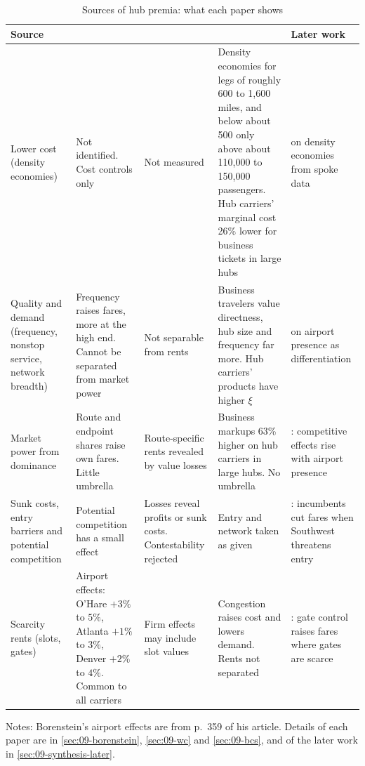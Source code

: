 \begin{table}[htbp]
\centering
\begin{threeparttable}
\caption{Sources of hub premia: what each paper shows}
\label{tab:09-sources}
\footnotesize
\begin{tabularx}{\textwidth}{@{}>{\raggedright\arraybackslash}p{1.9cm}>{\raggedright\arraybackslash}X
  >{\raggedright\arraybackslash}X>{\raggedright\arraybackslash}X>{\raggedright\arraybackslash}X@{}}
\toprule
Source & \citet{Borenstein1989} & \citet{WhinstonCollins1992} & \citet{BerryCarnallSpiller2006} & Later work \\
\midrule
Lower cost (density economies) & Not identified. Cost controls only & Not measured & Density economies for
  legs of roughly 600 to 1,600 miles, and below about 500 only above about 110,000 to 150,000 passengers. Hub carriers' marginal cost 26\% lower for
  business tickets in large hubs & \citet{BruecknerSpiller1994} on density economies from spoke data \\
\addlinespace
Quality and demand (frequency, nonstop service, network breadth) & Frequency raises fares, more at the high
  end. Cannot be separated from market power & Not separable from rents & Business travelers value
  directness, hub size and frequency far more. Hub carriers' products have higher $\xi$ & \citet{Berry1990}
  on airport presence as differentiation \\
\addlinespace
Market power from dominance & Route and endpoint shares raise own fares. Little umbrella & Route-specific
  rents revealed by value losses & Business markups 63\% higher on hub carriers in large hubs. No umbrella &
  \citet{CilibertoTamer2009}: competitive effects rise with airport presence \\
\addlinespace
Sunk costs, entry barriers and potential competition & Potential competition has a small effect & Losses
  reveal profits or sunk costs. Contestability rejected & Entry and network taken as given &
  \citet{GoolsbeeSyverson2008}: incumbents cut fares when Southwest threatens entry \\
\addlinespace
Scarcity rents (slots, gates) & Airport effects: O'Hare $+3\%$ to $5\%$, Atlanta $+1\%$ to $3\%$, Denver $+2\%$
  to $4\%$. Common to all carriers & Firm effects may include slot values & Congestion raises cost and lowers
  demand. Rents not separated & \citet{CilibertoWilliams2010}: gate control raises fares where gates are
  scarce \\
\bottomrule
\end{tabularx}
\begin{tablenotes}\footnotesize
\item Notes: Borenstein's airport effects are from p.~359 of his article. Details of each paper are in
\cref{sec:09-borenstein}, \cref{sec:09-wc} and \cref{sec:09-bcs}, and of the later work in
\cref{sec:09-synthesis-later}.
\end{tablenotes}
\end{threeparttable}
\end{table}

